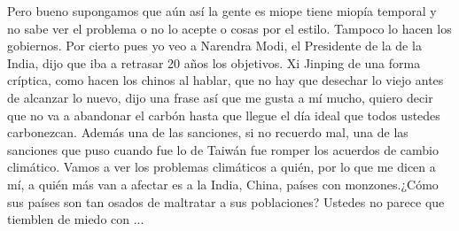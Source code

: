 Pero bueno supongamos que aún así la gente es miope tiene miopía temporal y no sabe ver el problema o no lo acepte o cosas por el estilo. Tampoco lo hacen los gobiernos. Por cierto pues yo veo a Narendra Modi, el Presidente de la de la India, dijo que iba a retrasar 20 años los objetivos. Xi Jinping de una forma críptica, como hacen los chinos al hablar, que no hay que desechar lo viejo antes de alcanzar lo nuevo, dijo una frase así que me gusta a mí mucho, quiero decir que no va a abandonar el carbón hasta que llegue el día ideal que todos ustedes carbonezcan. Además una de las sanciones, si no recuerdo mal, una de las sanciones que puso cuando fue lo de Taiwán fue romper los acuerdos de cambio climático. Vamos a ver los problemas climáticos a quién, por lo que me dicen a mí, a quién más van a afectar es a la India, China, países con monzones.¿Cómo sus países son tan osados de maltratar a sus poblaciones? Ustedes no parece que tiemblen de miedo con ... 

